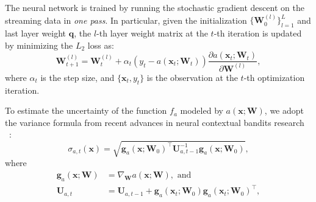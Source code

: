 The neural network is trained by running the stochastic gradient descent on the streaming data in \textit{one pass}. In particular, given the initialization $\{\mathbf{W}_0^{(l)} \}_{l=1}^L$ and last layer weight $\mathbf{q}$, the $l$-th layer weight matrix at the $t$-th iteration is updated by minimizing the $L_2$ loss as:
\begin{equation}
    \label{eqn:train_NN}
    \mathbf{W}_{t+1}^{(l)} = \mathbf{W}_{t}^{(l)} + \alpha_t (y_t - a(\mathbf{x}_t; \mathbf{W}_t)) \frac{\partial a(\mathbf{x}_t; \mathbf{W}_t)}{\partial \mathbf{W}^{(l)}},
\end{equation}
where $\alpha_t$ is the step size, and $\{\mathbf{x}_t, y_t\}$ is the observation at the $t$-th optimization iteration. 





To estimate the uncertainty of the function $f_a$ modeled by $a(\mathbf{x}; \mathbf{W})$, we adopt the variance formula from recent advances in neural contextual bandits research ~\citep{zhou2020neural, kassraie2022neural}:
\begin{equation}
\label{eqn:ntk_std}
    \sigma_{a,t}(\mathbf{x}) = \sqrt{\mathbf{g}_{a}(\mathbf{x}; \mathbf{W}_0)^\top \mathbf{U}_{a, t-1}^{-1} \mathbf{g}_{a}(\mathbf{x}; \mathbf{W}_0)},
\end{equation}
where
\begin{equation}
\label{eqn:ntk_cov}
\begin{aligned}
    \mathbf{g}_{a}(\mathbf{x}; \mathbf{W}) &= \nabla_{\mathbf{W}}a(\mathbf{x}; \mathbf{W}), \text{ and}\\
     \mathbf{U}_{a, t} &= \mathbf{U}_{a, t-1} + \mathbf{g}_{a}(\mathbf{x}_t; \mathbf{W}_0) \mathbf{g}_{a}(\mathbf{x}_t; \mathbf{W}_0)^\top,
\end{aligned}
\end{equation}

